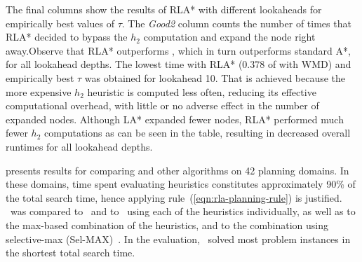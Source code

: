 The final columns show the results of RLA* with different lookaheads for
empirically best values of $\tau$. The {\em Good2} column counts the
number of times that RLA* decided to bypass the $h_2$ computation and
expand the node right away.Observe that RLA* outperforms \lazyastar,
which in turn outperforms standard A*, for all lookahead depths. The
lowest time with RLA* (0.378 of \astar with WMD) and empirically best
$\tau$  was obtained for lookahead 10. That is achieved because the
more expensive $h_2$ heuristic is computed less often, reducing its
effective computational overhead, with little or no adverse effect in
the number of expanded nodes. Although LA* expanded fewer nodes, RLA*
performed much fewer $h_2$ computations as can be seen in the table,
resulting in decreased overall runtimes for all lookahead depths.

\cite{TolpinEtAl.rla} presents results for comparing \rationallazyastar and
other algorithms on 42 planning domains. In these domains, time spent evaluating
heuristics constitutes approximately 90\% of the total search time,
hence applying rule~(\ref{eqn:rla-planning-rule}) is justified. 
\rationallazyastar~was compared to \lazyastar~and to \astar~using
each of the heuristics individually, as well as to the max-based
combination of the heuristics, and to the combination using selective-max
(Sel-MAX)~\cite{domshlak-et-al:jair-2012}. In the evaluation,
\rationallazyastar~solved most problem instances in the shortest
total search time.

